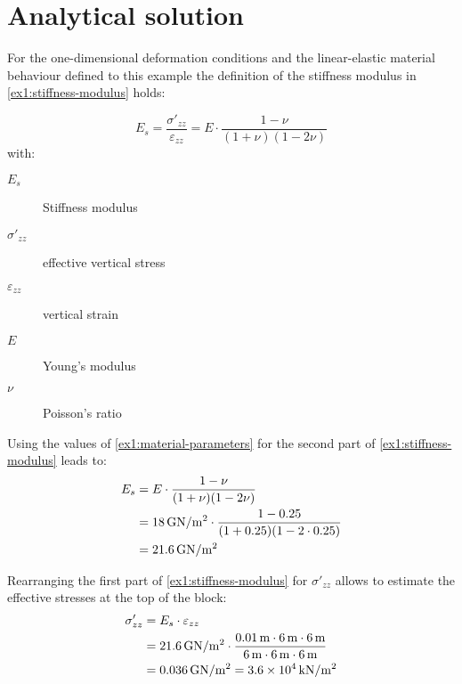 \section{Analytical solution}

For the one-dimensional deformation conditions and the linear-elastic material
behaviour defined to this example the definition of the stiffness modulus in
\autoref{ex1:stiffness-modulus} holds:

\begin{equation}
    \label{ex1:stiffness-modulus}
    E_s = \frac{\sigma'_{zz}}{\varepsilon_{zz}} = E \cdot \frac{1 - \nu}{(1 + \nu)(1 - 2 \nu)}
\end{equation}
with:
\begin{description}
    \item[$E_s$] Stiffness modulus
    \item[$\sigma'_{zz}$] effective vertical stress
    \item[$\varepsilon_{zz}$] vertical strain
    \item[$E$] Young's modulus
    \item[$\nu$] Poisson's ratio
\end{description}

Using the values of \autoref{ex1:material-parameters} for the second part of
\autoref{ex1:stiffness-modulus} leads to:
\begin{equation}
    \label{ex1:stiffness-modulus-value}
    \begin{split}
        E_s & = E \cdot \frac{1 - \nu}{(1 + \nu)(1 - 2 \nu)}                                                                       \\
            & = \SI{18}{\si[per-mode = symbol]{\giga\newton\per\square\metre}} \cdot \frac{1 - 0.25}{(1 + 0.25)(1 - 2 \cdot 0.25)} \\
            & = \SI{21.6}{\si[per-mode = symbol]{\giga\newton\per\square\metre}}
    \end{split}
\end{equation}

Rearranging the first part of \autoref{ex1:stiffness-modulus} for
$\sigma'_{zz}$ allows to estimate the effective stresses at the top of the
block:
\begin{equation}
    \label{ex1:effective_vertical_stress}
    \begin{split}
        \sigma'_{zz} & = E_s \cdot \varepsilon_{zz}                                                                                                                                                                               \\
                     & = \SI{21.6}{\si[per-mode = symbol]{\giga\newton\per\square\metre}} \cdot \frac{ \SI{0.01}{\metre} \cdot \SI{6}{\metre} \cdot \SI{6}{\metre} }{ \SI{6}{\metre} \cdot  \SI{6}{\metre} \cdot  \SI{6}{\metre}} \\
                     & = \SI{0.036}{\si[per-mode = symbol]{\giga\newton\per\square\metre}} = \SI{3.6E4}{\si[per-mode = symbol]{\kilo\newton\per\square\metre}}
    \end{split}
\end{equation}

